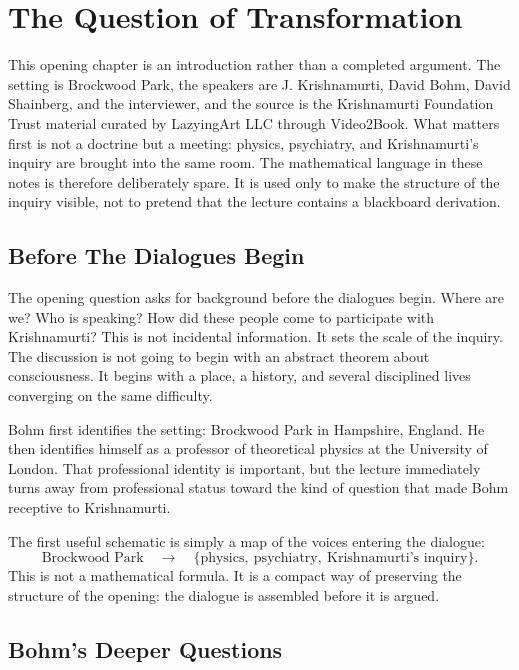 \chapter{The Question of Transformation}

This opening chapter is an introduction rather than a completed argument. The setting is Brockwood Park, the speakers are J. Krishnamurti, David Bohm, David Shainberg, and the interviewer, and the source is the Krishnamurti Foundation Trust material curated by LazyingArt LLC through Video2Book. What matters first is not a doctrine but a meeting: physics, psychiatry, and Krishnamurti's inquiry are brought into the same room. The mathematical language in these notes is therefore deliberately spare. It is used only to make the structure of the inquiry visible, not to pretend that the lecture contains a blackboard derivation.

\section{Before The Dialogues Begin}

The opening question asks for background before the dialogues begin. Where are we? Who is speaking? How did these people come to participate with Krishnamurti? This is not incidental information. It sets the scale of the inquiry. The discussion is not going to begin with an abstract theorem about consciousness. It begins with a place, a history, and several disciplined lives converging on the same difficulty.

Bohm first identifies the setting: Brockwood Park in Hampshire, England. He then identifies himself as a professor of theoretical physics at the University of London. That professional identity is important, but the lecture immediately turns away from professional status toward the kind of question that made Bohm receptive to Krishnamurti.

The first useful schematic is simply a map of the voices entering the dialogue:
\begin{equation}
\text{Brockwood Park}
\quad\longrightarrow\quad
\{\text{physics},\ \text{psychiatry},\ \text{Krishnamurti's inquiry}\}.
\end{equation}
This is not a mathematical formula. It is a compact way of preserving the structure of the opening: the dialogue is assembled before it is argued.

\section{Bohm's Deeper Questions}

